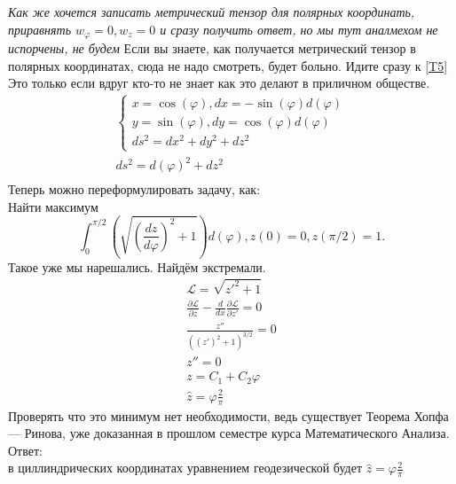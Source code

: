 \documentclass{article}
\newcommand{\Lagr}{\mathcal{L}}
\begin{document}
 \textcolor[rgb]{0.480469,0.566406,0.480469}{\textit{Как же хочется записать метрический тензор для полярных координать, приравнять $w_{\varphi}=0,w_{z}=0$ и сразу получить ответ, но мы тут аналмехом не испорчены, не будем}}
 Если вы знаете, как получается метрический тензор в полярных координатах, сюда не надо смотреть, будет больно. Идите сразу к \ref{T5} Это только если вдруг кто-то не знает как это делают в приличном обществе.
 \begin{gather*}
 \begin{cases}
     x=\cos{(\varphi)} ,
     dx = -\sin{(\varphi)} d(\varphi)\\
     y=\sin{(\varphi)} ,
     dy = \cos{(\varphi)} d(\varphi)\\
     ds^2=dx^2+dy^2+dz^2
 \end{cases}\\
    ds^2=d(\varphi)^2+dz^2\\
 \end{gather*} 
    Теперь можно переформулировать задачу, как:\\
    Найти максимум 
\begin{equation}\label{T5}
    \int_0^{\pi / 2} \left( \sqrt{\left(\frac{d z}{d \varphi} \right)^2+1} \right)  d(\varphi) ,z(0)=0,z(\pi/2)=1.
\end{equation}                                              
Такое уже мы нарешались.
Найдём экстремали.
\begin{gather*}
    \Lagr = \sqrt{z'^2+1}\\
     \frac{\partial \Lagr}{\partial z}  - \frac{d }{d x} \frac{\partial \Lagr}{\partial z'} =0 \\
     \frac{z''}{\left((z')^2+1\right)^{3/2}}=0\\
     z''=0\\
     z=C_1+C_2 \varphi\\
     \hat z = \varphi \frac{2}{\pi}
\end{gather*}
Проверять что это минимум нет необходимости, ведь существует Теорема Хопфа — Ринова, уже доказанная в прошлом семестре курса Математического Анализа.\\
Ответ:\\
в циллиндрических координатах уравнением геодезической будет $ \hat z = \varphi \frac{2}{\pi}$
\end{document}
